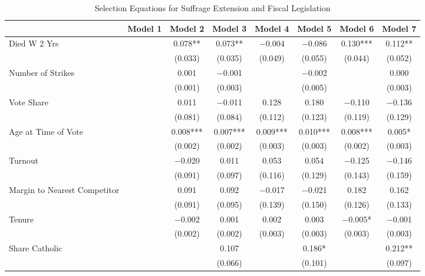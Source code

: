 \begin{table}

\caption{\label{tab:ols_selection}Selection Equations for Suffrage Extension and Fiscal Legislation}
\centering
\begin{tabular}[t]{lccccccc}
\toprule
  & Model 1 & Model 2 & Model 3 & Model 4 & Model 5 & Model 6 & Model 7\\
\midrule
Died W 2 Yrs &  & \num{0.078}** & \num{0.073}** & \num{-0.004} & \num{-0.086} & \num{0.130}*** & \num{0.112}**\\
 &  & (\num{0.033}) & (\num{0.035}) & (\num{0.049}) & (\num{0.055}) & (\num{0.044}) & (\num{0.052})\\
Number of Strikes &  & \num{0.001} & \num{-0.001} &  & \num{-0.002} &  & \num{0.000}\\
 &  & (\num{0.001}) & (\num{0.003}) &  & (\num{0.005}) &  & (\num{0.003})\\
Vote Share &  & \num{0.011} & \num{-0.011} & \num{0.128} & \num{0.180} & \num{-0.110} & \num{-0.136}\\
 &  & (\num{0.081}) & (\num{0.084}) & (\num{0.112}) & (\num{0.123}) & (\num{0.119}) & (\num{0.129})\\
Age at Time of Vote &  & \num{0.008}*** & \num{0.007}*** & \num{0.009}*** & \num{0.010}*** & \num{0.008}*** & \num{0.005}*\\
 &  & (\num{0.002}) & (\num{0.002}) & (\num{0.003}) & (\num{0.003}) & (\num{0.002}) & (\num{0.003})\\
Turnout &  & \num{-0.020} & \num{0.011} & \num{0.053} & \num{0.054} & \num{-0.125} & \num{-0.146}\\
 &  & (\num{0.091}) & (\num{0.097}) & (\num{0.116}) & (\num{0.129}) & (\num{0.143}) & (\num{0.159})\\
Margin to Nearest Competitor &  & \num{0.091} & \num{0.092} & \num{-0.017} & \num{-0.021} & \num{0.182} & \num{0.162}\\
 &  & (\num{0.091}) & (\num{0.095}) & (\num{0.139}) & (\num{0.150}) & (\num{0.126}) & (\num{0.133})\\
Tenure &  & \num{-0.002} & \num{0.001} & \num{0.002} & \num{0.003} & \num{-0.005}* & \num{-0.001}\\
 &  & (\num{0.002}) & (\num{0.002}) & (\num{0.003}) & (\num{0.003}) & (\num{0.003}) & (\num{0.003})\\
Share Catholic &  &  & \num{0.107} &  & \num{0.186}* &  & \num{0.212}**\\
 &  &  & (\num{0.066}) &  & (\num{0.101}) &  & (\num{0.097})\\

\end{tabular}
\end{table}
